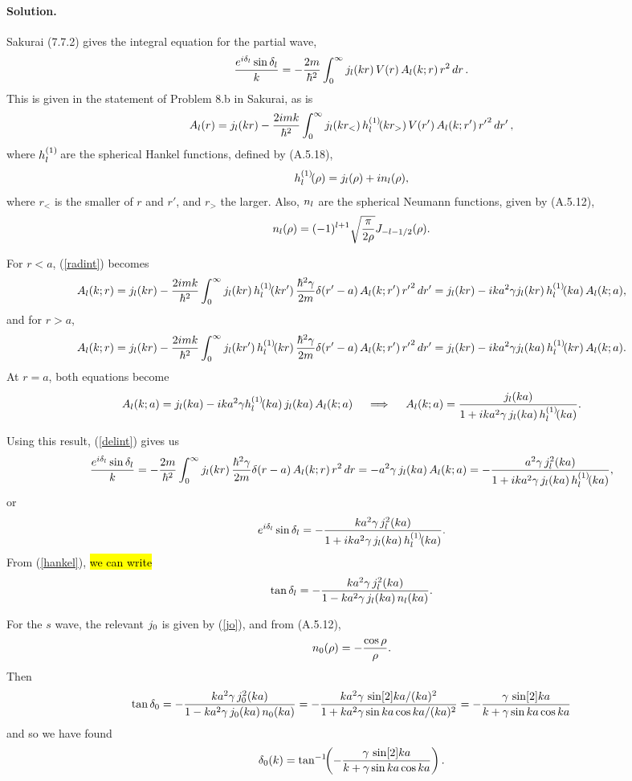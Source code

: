 \documentclass[11pt]{article}
\newcommand{\refeq}[1]{(\ref{#1})}
\newcommand{\beq}{\begin{equation*}}
\newcommand{\eeq}{\end{equation*}}
\newcommand{\beqn}{\begin{equation}}
\newcommand{\eeqn}{\end{equation}}
\newcommand{\vfix}{\vspace{-\baselineskip}}
\newenvironment{solution}
{
	\paragraph{Solution.}
}
{
	\bigskip
}
\newcommand{\qimplies}{\quad \implies \quad}
\begin{document}
\begin{solution}
	Sakurai (7.7.2) gives the integral equation for the partial wave,
	\beqn \label{delint}
		\frac{e^{i \dell} \sin\dell}{k} = -\frac{2m}{\hbar^2} \intoi \jl(kr) \, V(r) \, \Al(k; r) \, r^2 \dr.
	\eeqn
	This is given in the statement of Problem 8.b in Sakurai, as is
	\beqn \label{radint}
		\Al(r) = \jl(kr) - \frac{2 i m k}{\hbar^2} \intoi \jl(k r_<) \, \hql(k r_>) \, V(r') \, \Al(k; r') \, {r'}^2 \drp,
	\eeqn
	where $h_l^{(1)}\!$ are the spherical Hankel functions, defined by (A.5.18),
	\beqn \label{hankel}
		\hql(\rho) = \jl(\rho) + i \nl(\rho),
	\eeqn
	where $r_<$ is the smaller of $r$ and $r'$, and $r_>$ the larger.  Also, $n_l$ are the spherical Neumann functions, given by (A.5.12),
	\beq
		\nl(\rho) = (-1)^{l+1} \sqrt{\frac{\pi}{2\rho}} J_{-l-1/2}(\rho).
	\eeq
	
	For $r < a$, \refeq{radint} becomes
	\beq
		\Al(k; r) = \jl(kr) - \frac{2 i m k}{\hbar^2} \intoi \jl(kr) \, \hql(kr') \, \frac{\hbar^2 \gam}{2m} \del(r' - a) \, \Al(k; r') \, {r'}^2 \drp
		= \jl(kr) - i k a^2 \gam \jl(kr) \, \hql(ka) \, \Al(k; a),
	\eeq
	and for $r > a$,
	\beq
		\Al(k; r) = \jl(kr) - \frac{2 i m k}{\hbar^2} \intoi \jl(kr') \, \hql(kr) \, \frac{\hbar^2 \gam}{2m} \del(r' - a) \, \Al(k; r') \, {r'}^2 \drp
		= \jl(kr) - i k a^2 \gam \jl(ka) \, \hql(kr) \, \Al(k; a).
	\eeq
	At $r = a$, both equations become
	\beq
		\Al(k; a) = \jl(ka) - i k a^2 \gam \hql(ka) \, \jl(ka) \, \Al(k; a)
		\qimplies
		\Al(k; a) = \frac{\jl(ka)}{1 + i k a^2 \gam \, \jl(ka) \, \hql(ka)}.
	\eeq
	
	Using this result, \refeq{delint} gives us
	\beq
		\frac{e^{i \dell} \sin\dell}{k} = -\frac{2m}{\hbar^2} \intoi \jl(kr) \, \frac{\hbar^2 \gam}{2m} \del(r - a) \, \Al(k; r) \, r^2 \dr
		= -a^2 \gam \, \jl(ka) \, \Al(k; a)
		= -\frac{a^2 \gam \, \jl^2(ka)}{1 + i k a^2 \gam \, \jl(ka) \, \hql(ka)},
	\eeq
	or
	\beq
		e^{i \dell} \sin\dell = -\frac{k a^2 \gam \, \jl^2(ka)}{1 + i k a^2 \gam \, \jl(ka) \, \hql(ka)}. %
	\eeq
	From \refeq{hankel}, \hl{we can write}
	\beq
		\tan\dell = -\frac{k a^2 \gam \, \jl^2(ka)}{1 - k a^2 \gam \, \jl(ka) \, \nl(ka)}.
	\eeq
	
	For the $s$ wave, the relevant $j_0$ is given by \refeq{jo}, and from (A.5.12),
	\beq
		\no(\rho) = -\frac{\cos\rho}{\rho}.
	\eeq
	Then
	\beqn \label{tandelo}
		\tan\delo = -\frac{k a^2 \gam \, \jo^2(ka)}{1 - k a^2 \gam \, \jo(ka) \, \no(ka)}
		= -\frac{k a^2 \gam \, \sin[2] ka / (ka)^2}{1 + k a^2 \gam \sin ka \cos ka / (ka)^2}
		= -\frac{\gam \, \sin[2] ka}{k + \gam \sin ka \cos ka}
	\eeqn
	and so we have found
	\beqn \label{delo}
		\delo(k) = \tan^{-1}\!\!\left( -\frac{\gam \, \sin[2] ka}{k + \gam \sin ka \cos ka} \right).
	\eeqn
	\vfix
\end{solution}
\end{document}
